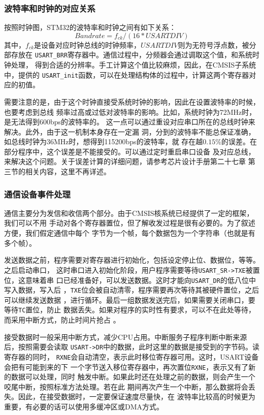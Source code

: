 \documentclass[a4paper]{ctexart}
\begin{document}
\subsubsection{波特率和时钟的对应关系}

按照时钟图，STM32的波特率和时钟之间有如下关系：
$$ Bandrate = f_{ck} / (16 * {USARTDIV}) $$
其中，$f_{ck}$是设备对应时钟总线的时钟频率，$USARTDIV$则为无符号浮点数，被分部存放在
\lstinline{USART_BRR}寄存器中。通信过程中，分频器会通过调取这个值，和系统时钟处理，
得到合适的分辨率。手工计算这个值比较麻烦，因此，在CMSIS子系统中，提供的
\lstinline{USART_init}函数，可以在处理结构体的过程中，计算这两个寄存器对应的初值。

需要注意的是，由于这个时钟直接受系统时钟的影响，因此在设置波特率的时候，也要考虑到总线
频率过高或过低对波特率的影响。比如，系统时钟为72MHz时，是无法得到600bps的波特率的。
这一点可以通过重设对应串口所在的总线时钟来解决。此外，由于这一机制本身存在一定漏
洞，分到的波特率不能总保证准确，如总线时钟为36MHz时，想得到115200bps的波特率，就
存在越$0.15\%$的误差。在部分程序中，这个误差是不能接受的。可以通过定时重启串口设备
及对应总线，来解决这个问题。关于误差计算的详细问题，请参考芯片设计手册第二十七章
第三节的相关内容，这里不再详述。

\subsubsection{通信设备事件处理}

通信主要分为发信和收信两个部分。由于CMSIS核系统已经提供了一定的框架，我们可以不用
手动对各个寄存器置位，但了解收发过程是很有必要的。为了叙述方便，我们假定通信中每个
字节为一个帧，每个数据包为一个字符串（也就是有多个帧）。

发送数据之前，程序需要对寄存器进行初始化，包括设定停止位、数据位，等等。之后启动串口，
这时串口进入初始化阶段，用户程序需要等待\lstinline{USART_SR->TXE}被置位，这意味着串
口已经准备好，可以发送数据。这时才能向\lstinline{USART_DR}的低八位中写入数据，写入后
，\lstinline{TXE}位会被自动清零，程序需要再次等待其被硬件置位，之后可以继续发送数据
，进行循环。最后一组数据发送完后，如果需要关闭串口，要等待\lstinline{TC}置位，防止
数据丢失。如果对程序的实时性有要求，可以不在此处等待，而采用中断方式，防止时间片抢占
。

接受数据时一般采用中断方式，减少CPU占用。中断服务子程序判断中断来源后，按照需要会读取
\lstinline{USART->DR}中的数据，此时这里的数据是接受到的字节码。读寄存器的同时，
\lstinline{RXNE}会自动清空，表示此时移位寄存器可用。这时，USART设备会把有可能到来的下
一个字节送入移位寄存器中，再次置位\lstinline{RXNE}，表示又有了新的数据可以处理，同时
触发中断。如果此时还在处理之前的数据，则会产生一个咬尾中断，按照标准方法处理。若在此
期间再次产生一个中断，那么数据将会丢失。因此，在接受数据时，一定要保证速度尽量快，在
波特率比较高的时候更为重要，有必要的话可以使用多缓冲区或DMA方式。
\end{document}

